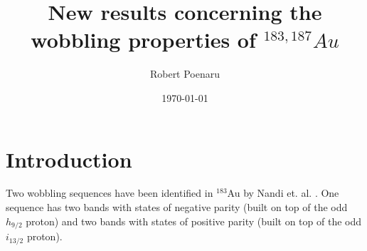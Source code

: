 \documentclass[12pt, a4paper]{article}
\title{New results concerning the wobbling properties of $^{183,187}Au$}
\author{Robert Poenaru}
\date{\today}
\begin{document}
\maketitle

\section{Introduction}

Two wobbling sequences have been identified in $^{183}$Au by Nandi et. al. \cite{nandi2020}. One sequence has two bands with states of negative parity (built on top of the odd $h_{9/2}$ proton) and two bands with states of positive parity (built on top of the odd $i_{13/2}$ proton).


\end{document}
